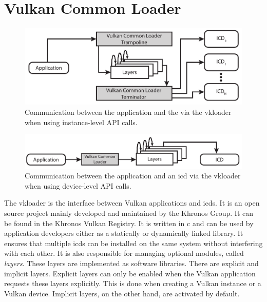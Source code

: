   \section{Vulkan Common Loader}
  \label{sec:VulkanLoader}

    \begin{figure}
      \includegraphics[width=\textwidth]{Main/Images/VulkanLoaderInstanceLayers}
      \centering
      \caption{Communication between the application and the  via the \gls{vkloader} when using instance-level API calls.}
      \label{fig:VulkanLoaderWithInstanceLayers}
    \end{figure}

    \begin{figure}
      \includegraphics[width=\textwidth]{Main/Images/VulkanLoaderDeviceLayers}
      \centering
      \caption{Communication between the application and an \acrfull{icd} via the \gls{vkloader} when using device-level API calls.}
      \label{fig:VulkanLoaderWithDeviceLayers}
    \end{figure}

    The \gls{vkloader} is the interface between Vulkan applications and \glspl{icd}.
    It is an open source project mainly developed and maintained by the Khronos Group.
    It can be found in the Khronos Vulkan Registry\cite{vulkanregistry}.
    It is written in \gls{c} and can be used by application developers either as a statically or dynamically linked library.
    It ensures that multiple \glspl{icd} can be installed on the same system without interfering with each other.
    It is also responsible for managing optional modules, called \textit{layers}.
    These layers are implemented as software libraries.
    There are explicit and implicit layers.
    Explicit layers can only be enabled when the Vulkan application requests these layers explicitly.
    This is done when creating a Vulkan instance or a Vulkan device.
    Implicit layers, on the other hand, are activated by default.

